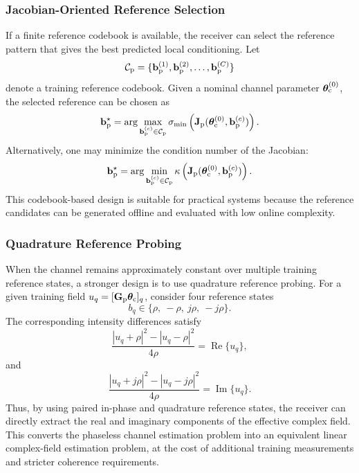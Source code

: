 \documentclass[journal]{IEEEtran}
\begin{document}
\subsubsection{Jacobian-Oriented Reference Selection}

If a finite reference codebook is available, the receiver can select the reference pattern that gives the best predicted local conditioning. 
Let
\begin{equation}
\mathcal{C}_{\rm p}
=
\{
\mathbf{b}_{\rm p}^{(1)},
\mathbf{b}_{\rm p}^{(2)},
\ldots,
\mathbf{b}_{\rm p}^{(C)}
\}
\end{equation}
denote a training reference codebook. 
Given a nominal channel parameter $\boldsymbol{\theta}_{\rm c}^{(0)}$, the selected reference can be chosen as
\begin{equation}
\mathbf{b}_{\rm p}^{\star}
=
\arg\max_{\mathbf{b}_{\rm p}^{(c)}\in\mathcal{C}_{\rm p}}
\sigma_{\min}
\left(
\mathbf{J}_{\rm p}
(\boldsymbol{\theta}_{\rm c}^{(0)},\mathbf{b}_{\rm p}^{(c)})
\right).
\label{eq:codebook_reference_selection}
\end{equation}
Alternatively, one may minimize the condition number of the Jacobian:
\begin{equation}
\mathbf{b}_{\rm p}^{\star}
=
\arg\min_{\mathbf{b}_{\rm p}^{(c)}\in\mathcal{C}_{\rm p}}
\kappa
\left(
\mathbf{J}_{\rm p}
(\boldsymbol{\theta}_{\rm c}^{(0)},\mathbf{b}_{\rm p}^{(c)})
\right).
\label{eq:codebook_reference_selection_kappa}
\end{equation}
This codebook-based design is suitable for practical systems because the reference candidates can be generated offline and evaluated with low online complexity.

\subsubsection{Quadrature Reference Probing}

When the channel remains approximately constant over multiple training reference states, a stronger design is to use quadrature reference probing. 
For a given training field $u_q=[\mathbf{G}_{\rm p}\boldsymbol{\theta}_{\rm c}]_q$, consider four reference states
\begin{equation}
b_q\in
\{
\rho,\ -\rho,\ j\rho,\ -j\rho
\}.
\end{equation}
The corresponding intensity differences satisfy
\begin{equation}
\frac{
|u_q+\rho|^2-|u_q-\rho|^2
}{
4\rho
}
=
\operatorname{Re}\{u_q\},
\label{eq:quadrature_real}
\end{equation}
and
\begin{equation}
\frac{
|u_q+j\rho|^2-|u_q-j\rho|^2
}{
4\rho
}
=
\operatorname{Im}\{u_q\}.
\label{eq:quadrature_imag}
\end{equation}
Thus, by using paired in-phase and quadrature reference states, the receiver can directly extract the real and imaginary components of the effective complex field. 
This converts the phaseless channel estimation problem into an equivalent linear complex-field estimation problem, at the cost of additional training measurements and stricter coherence requirements.
\end{document}
